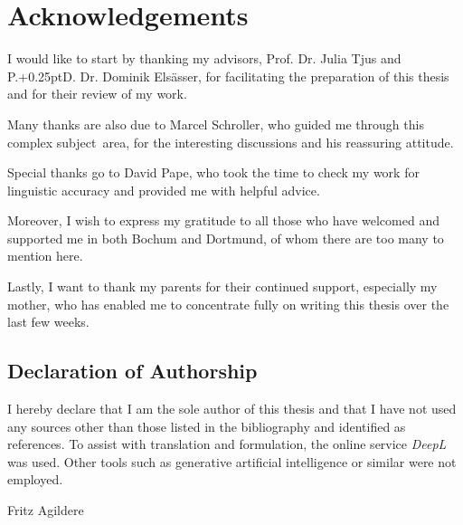 \chapter*{Acknowledgements}
\label{ch:acknowledgements}

I would like to start by thanking my advisors, Prof. Dr. Julia Tjus and P{\kern-0.25pt}.{\kern+0.25pt}D. Dr. Dominik Elsässer,
for facilitating the preparation of this thesis and for their review of my work.

Many thanks are also due to Marcel Schroller, who guided me through this complex subject~area,
for the interesting discussions and his reassuring attitude.

Special thanks go to David Pape, who took the time to check my work for linguistic
accuracy and provided me with helpful advice.

Moreover, I wish to express my gratitude to all those who have welcomed and supported me in
both Bochum and Dortmund, of whom there are too many to mention here.

Lastly, I want to thank my parents for their continued support, especially my mother,
who has enabled me to concentrate fully on writing this thesis over the last few weeks.

\vfill

\section*{Declaration of Authorship}

I hereby declare that I am the sole author of this thesis and that I have not used
any sources other than those listed in the bibliography and identified as references.
To assist with translation and formulation, the online service \emph{DeepL} was used.
Other tools such as generative artificial intelligence or similar were not employed.

Fritz Agildere
